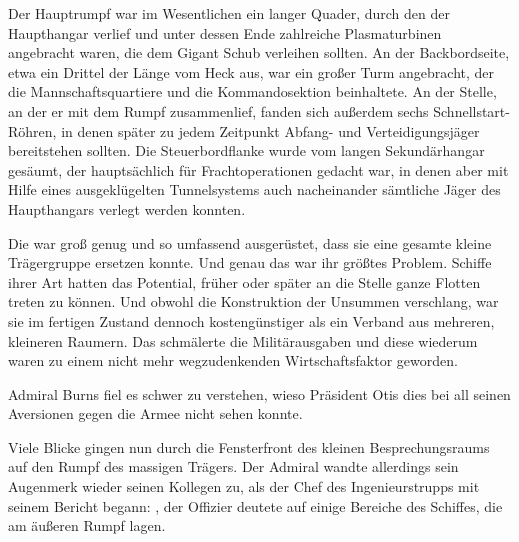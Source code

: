 \par

Der Hauptrumpf war im Wesentlichen ein langer Quader, durch den der Haupthangar verlief und unter dessen Ende zahlreiche Plasmaturbinen angebracht waren, die dem Gigant Schub verleihen sollten. An der Backbordseite, etwa ein Drittel der Länge vom Heck aus, war ein großer Turm angebracht, der die Mannschaftsquartiere und die Kommandosektion beinhaltete. An der Stelle, an der er mit dem Rumpf zusammenlief, fanden sich außerdem sechs Schnellstart-Röhren, in denen später zu jedem Zeitpunkt Abfang- und Verteidigungsjäger bereitstehen sollten. Die Steuerbordflanke wurde vom langen Sekundärhangar gesäumt, der hauptsächlich für Frachtoperationen gedacht war, in denen aber mit Hilfe eines ausgeklügelten Tunnelsystems auch nacheinander sämtliche Jäger des Haupthangars verlegt werden konnten.

\par

Die  war groß genug und so umfassend ausgerüstet, dass sie eine gesamte kleine Trägergruppe ersetzen konnte. Und genau das war ihr größtes Problem. Schiffe ihrer Art hatten das Potential, früher oder später an die Stelle ganze Flotten treten zu können. Und obwohl die Konstruktion der  Unsummen verschlang, war sie im fertigen Zustand dennoch kostengünstiger als ein Verband aus mehreren, kleineren Raumern. Das schmälerte die Militärausgaben und diese wiederum waren zu einem nicht mehr wegzudenkenden Wirtschaftsfaktor geworden.

\par

Admiral Burns fiel es schwer zu verstehen, wieso Präsident Otis dies bei all seinen Aversionen gegen die Armee nicht sehen konnte.

\par

Viele Blicke gingen nun durch die Fensterfront des kleinen Besprechungsraums auf den Rumpf des massigen Trägers. Der Admiral wandte allerdings sein Augenmerk wieder seinen Kollegen zu, als der Chef des Ingenieurstrupps mit seinem Bericht begann: , der Offizier deutete auf einige Bereiche des Schiffes, die am äußeren Rumpf lagen. 


